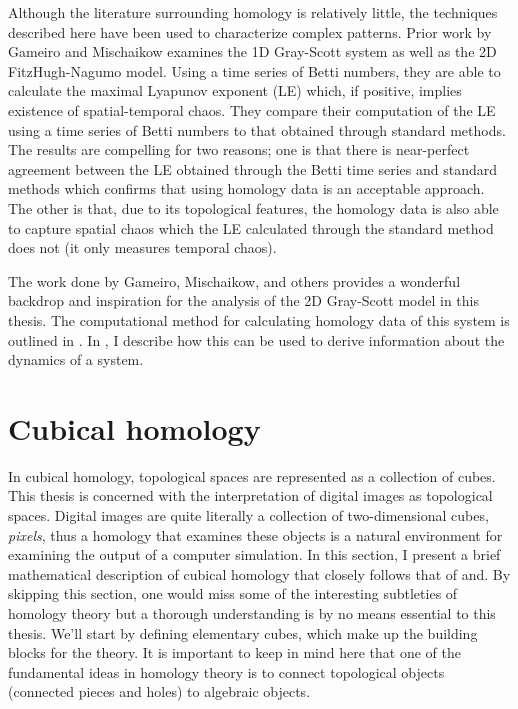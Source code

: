 Although the literature surrounding homology is relatively little, the techniques described here have been used to characterize complex patterns. Prior work by Gameiro and Mischaikow examines the 1D Gray-Scott system as well as the 2D FitzHugh-Nagumo model. Using a time series of Betti numbers, they are able to calculate the maximal Lyapunov exponent (LE) which, if positive, implies existence of spatial-temporal chaos. They compare their computation of the LE using a time series of Betti numbers to that obtained through standard methods. The results are compelling for two reasons; one is that there is near-perfect agreement between the LE obtained through the Betti time series and standard methods which confirms that using homology data is an acceptable approach. The other is that, due to its topological features, the homology data is also able to capture spatial chaos which the LE calculated through the standard method does not (it only measures temporal chaos).

The work done by Gameiro, Mischaikow, and others provides a wonderful backdrop and inspiration for the analysis of the 2D Gray-Scott model in this thesis. The computational method for calculating homology data of this system is outlined in . In , I describe how this can be used to derive information about the dynamics of a system.

\section{Cubical homology} \label{ch2:cubicalhomology}

In cubical homology, topological spaces are represented as a collection of cubes. This thesis is concerned with the interpretation of digital images as topological spaces. Digital images are quite literally a collection of two-dimensional cubes, \textit{pixels}, thus a homology that examines these objects is a natural environment for examining the output of a computer simulation. In this section, I present a brief mathematical description of cubical homology that closely follows that of and. By skipping this section, one would miss some of the interesting subtleties of homology theory but a thorough understanding is by no means essential to this thesis. We'll start by defining elementary cubes, which make up the building blocks for the theory. It is important to keep in mind here that one of the fundamental ideas in homology theory is to connect topological objects (\eg connected pieces and holes) to algebraic objects.

